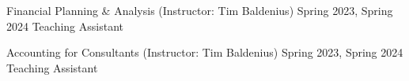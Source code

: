 

\begin{cventries}

\cventrysimple
    {Financial Planning \& Analysis (Instructor: Tim Baldenius)}  %
    {Spring 2023, Spring 2024} %
    {Teaching Assistant}
	
\cventrysimple
	{Accounting for Consultants (Instructor: Tim Baldenius)}  %
    {Spring 2023, Spring 2024} %
{Teaching Assistant}


\end{cventries}
